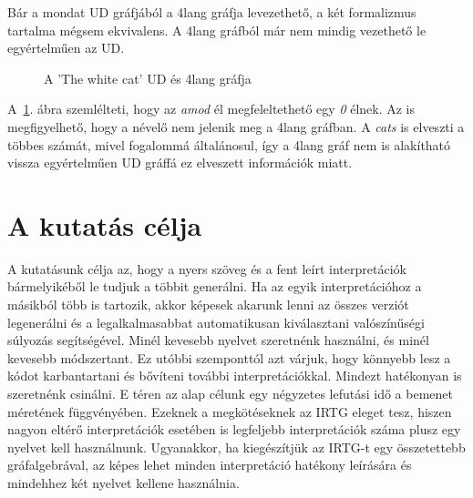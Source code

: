 Bár a mondat UD gráfjából a 4lang gráfja levezethető, a két formalizmus tartalma mégsem ekvivalens. A 4lang gráfból már nem mindig vezethető le egyértelműen az UD.

\begin{figure}[h]
\centering 
{}


\caption{A 'The white cat' UD és 4lang gráfja }
\label{fig:thewhitecat}  
\end{figure}

A~\ref{fig:thewhitecat}. ábra szemlélteti, hogy az \textit{amod} él megfeleltethető egy \textit{0} élnek. Az is megfigyelhető, hogy a névelő nem jelenik meg a 4lang gráfban. A \textit{cats} is elveszti a többes számát, mivel fogalommá általánosul, így a 4lang gráf nem is alakítható vissza egyértelműen UD gráffá ez elveszett információk miatt.


\section{A kutatás célja}
\label{sec:goals}

A kutatásunk célja az, hogy a nyers szöveg és a fent leírt interpretációk bármelyikéből le tudjuk a többit generálni. Ha az egyik interpretációhoz a másikból több is tartozik, akkor képesek akarunk lenni az összes verziót legenerálni és a legalkalmasabbat automatikusan kiválasztani valószínűségi súlyozás segítségével. Minél kevesebb nyelvet szeretnénk használni, és minél kevesebb módszertant. Ez utóbbi szemponttól azt várjuk, hogy könnyebb lesz a kódot karbantartani és bővíteni további interpretációkkal. Mindezt hatékonyan is szeretnénk csinálni. E téren az alap célunk egy négyzetes lefutási idő a bemenet méretének függvényében. Ezeknek a megkötéseknek az IRTG eleget tesz, hiszen nagyon eltérő interpretációk esetében is legfeljebb interpretációk száma plusz egy nyelvet kell használnunk. Ugyanakkor, ha kiegészítjük az IRTG-t egy összetettebb gráfalgebrával, az képes lehet minden interpretáció hatékony leírására és mindehhez két nyelvet kellene használnia.

